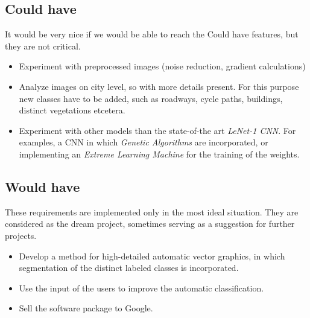 \documentclass[a4paper,onecolumn]{report}
\begin{document}
\subsection{Could have}
It would be very nice if we would be able to reach the Could have features, but they are not critical. 
\begin{itemize}
\item Experiment with preprocessed images (noise reduction, gradient calculations)
\item Analyze images on city level, so with more details present. For this purpose new classes have to be added, such as roadways, cycle paths, 	buildings, distinct vegetations etcetera. 
\item Experiment with other models than the state-of-the art \textit{LeNet-1 CNN}. For examples, a CNN in which \textit{Genetic Algorithms} are incorporated, or implementing an \textit{Extreme Learning Machine} for the training of the weights. 
\end{itemize}

\subsection{Would have}
These requirements are implemented only in the most ideal situation. They are considered as the dream project, sometimes serving as a suggestion for further projects. 

\begin{itemize}
\item Develop a method for high-detailed automatic vector graphics, in which segmentation of the distinct labeled classes is incorporated.
\item Use the input of the users to improve the automatic classification. 
\item Sell the software package to Google. 
\end{itemize}
\end{document}
